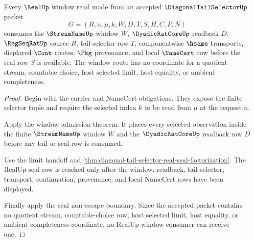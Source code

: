 \begin{theorem}
\label{thm:diagonal-tail-selector-realup-window-nonescape}
Every $\RealUp$ window read made from an accepted $\DiagonalTailSelectorUp$
packet
$$
G=(R,n,\mu,k,W,D,T,S,H,C,P,N)
$$
consumes the $\StreamNameUp$ window $W$, $\DyadicRatCoreUp$ readback $D$,
$\RegSeqRatUp$ source $R$, tail-selector row $T$, componentwise $\hsame$
transports, displayed $\Cont$ routes, $\Pkg$ provenance, and local
$\NameCert$ row before the seal row $S$ is available. The window route has no
coordinate for a quotient stream, countable choice, host selected limit, host
equality, or ambient completeness.
\end{theorem}
\begin{proof}
Begin with the carrier and NameCert obligations. They expose the finite
selector tuple and require the selected index $k$ to be read from $\mu$ at
the request $n$.

Apply the window admission theorem. It places every selected observation
inside the finite $\StreamNameUp$ window $W$ and the $\DyadicRatCoreUp$
readback row $D$ before any tail or seal row is consumed.

Use the limit handoff and
\autoref{thm:diagonal-tail-selector-real-seal-factorization}. The RealUp seal
row is reached only after the window, readback, tail-selector, transport,
continuation, provenance, and local NameCert rows have been displayed.

Finally apply the seal non-escape boundary. Since the accepted packet contains
no quotient stream, countable-choice row, host selected limit, host equality,
or ambient completeness coordinate, no RealUp window consumer can receive one.
\end{proof}


